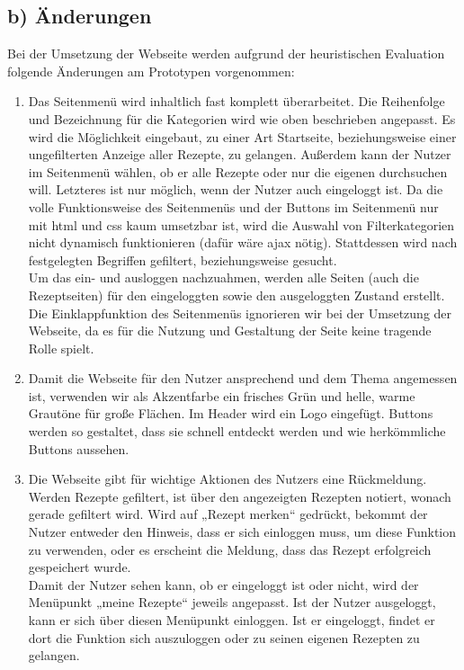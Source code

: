 \documentclass[parskip,10pt,abstracton]{scrartcl}
\newcommand{\sbt}{\begin{picture}(-1,1)(-1,-3)\circle*{3}\end{picture}\ } %
\begin{document}
\subsection*{b) Änderungen}
Bei der Umsetzung der Webseite werden aufgrund der heuristischen Evaluation folgende Änderungen am Prototypen vorgenommen:
\begin{enumerate}[\sbt]
 \item Das Seitenmenü wird inhaltlich fast komplett überarbeitet. Die Reihenfolge und Bezeichnung für die Kategorien wird wie oben beschrieben angepasst. Es wird die Möglichkeit eingebaut, zu einer Art Startseite, beziehungsweise einer ungefilterten Anzeige aller Rezepte, zu gelangen. Außerdem kann der Nutzer im Seitenmenü wählen, ob er alle Rezepte oder nur die eigenen durchsuchen will. Letzteres ist nur möglich, wenn der Nutzer auch eingeloggt ist. Da die volle Funktionsweise des Seitenmenüs und der Buttons im Seitenmenü nur mit html und css kaum umsetzbar ist, wird die Auswahl von Filterkategorien nicht dynamisch funktionieren (dafür wäre ajax nötig). Stattdessen wird nach festgelegten Begriffen gefiltert, beziehungsweise gesucht.\\
 Um das ein- und ausloggen nachzuahmen, werden alle Seiten (auch die Rezeptseiten) für den eingeloggten sowie den ausgeloggten Zustand erstellt.\\
 Die Einklappfunktion des Seitenmenüs ignorieren wir bei der Umsetzung der Webseite, da es für die Nutzung und Gestaltung der Seite keine tragende Rolle spielt.

 \item Damit die Webseite für den Nutzer ansprechend und dem Thema angemessen ist, verwenden wir als Akzentfarbe ein frisches Grün und helle, warme Grautöne für große Flächen. Im Header wird ein Logo eingefügt. Buttons werden so gestaltet, dass sie schnell entdeckt werden und wie herkömmliche Buttons aussehen.
 
 \item Die Webseite gibt für wichtige Aktionen des Nutzers eine Rückmeldung. Werden Rezepte gefiltert, ist über den angezeigten Rezepten notiert, wonach gerade gefiltert wird. Wird auf „Rezept merken“ gedrückt, bekommt der Nutzer entweder den Hinweis, dass er sich einloggen muss, um diese Funktion zu verwenden, oder es erscheint die Meldung, dass das Rezept erfolgreich gespeichert wurde.\\
 Damit der Nutzer sehen kann, ob er eingeloggt ist oder nicht, wird der Menüpunkt „meine Rezepte“ jeweils angepasst. Ist der Nutzer ausgeloggt, kann er sich über diesen Menüpunkt einloggen. Ist er eingeloggt, findet er dort die Funktion sich auszuloggen oder zu seinen eigenen Rezepten zu gelangen.
\end{enumerate}
\end{document}
